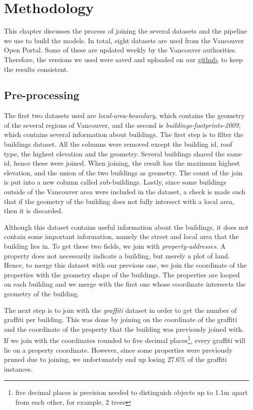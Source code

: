 \chapter{Methodology}


This chapter discusses the process of joining the several datasets and the pipeline we use to build the models. In total, eight datasets are used from the Vancouver Open Portal. Some of these are updated weekly by the Vancouver authorities. Therefore, the versions we used were saved and uploaded on our \href{https://github.com/CowKeyMan/PredictingGraffitiUsingCityLayouts}{github}, to keep the results consistent.

\section{Pre-processing}

The first two datasets used are \textit{local-area-boundary}, which contains the geometry of the several regions of Vancouver, and the second is \textit{buildings-footprints-2009}, which contains several information about buildings. The first step is to filter the buildings dataset. All the columns were removed except the building id, roof type, the highest elevation and the geometry. Several buildings shared the same id, hence these were joined. When joining, the result has the maximum highest elevation, and the union of the two buildings as geometry. The count of the join is put into a new column called sub-buildings. Lastly, since some buildings outside of the Vancouver area were included in the dataset, a check is made such that if the geometry of the building does not fully intersect with a local area, then it is discarded.

Although this dataset contains useful information about the buildings, it does not contain some important information, namely the street and local area that the building lies in. To get these two fields, we join with \textit{property-addresses}. A property does not necessarily indicate a building, but merely a plot of land. Hence, to merge this dataset with our previous one, we join the coordinate of the properties with the geometry shape of the buildings. The properties are looped on each building and we merge with the first one whose coordinate intersects the geometry of the building.

The next step is to join with the \textit{graffiti} dataset in order to get the number of graffiti per building. This was done by joining on the coordinate of the graffiti and the coordinate of the property that the building was previously joined with. If we join with the coordinates rounded to five decimal places\footnote{five decimal places is precision needed to distinguish objects up to 1.1m apart from each other, for example, 2 trees}, every graffiti will lie on a property coordinate. However, since some properties were previously pruned due to joining, we unfortunately end up losing 27.6\% of the graffiti instances.

